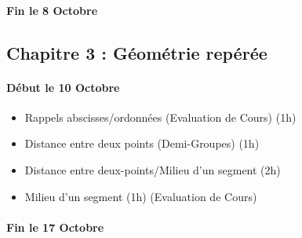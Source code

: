 \documentclass{article}
\begin{document}
\paragraph{Fin le 8 Octobre}
\subsection*{Chapitre 3 : Géométrie repérée}
\paragraph{Début le 10 Octobre}
\begin{itemize}
\item Rappels abscisses/ordonnées (Evaluation de Cours) (1h)
\item Distance entre deux points (Demi-Groupes) (1h)
\item Distance entre deux-points/Milieu d'un segment (2h)
\item Milieu d'un segment (1h) (Evaluation de Cours) 
\end{itemize}
\paragraph{Fin le 17 Octobre}
\end{document}
